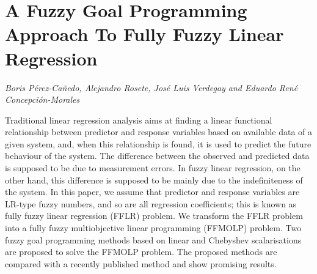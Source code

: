 \documentclass[../booklet.tex]{subfiles}
\begin{document}
\section[A Fuzzy Goal Programming Approach To Fully Fuzzy Linear Regression. {\it Boris Pérez-Cañedo, Alejandro Rosete, José Luis Verdegay and Eduardo René Concepción-Morales}]{A Fuzzy Goal Programming Approach To Fully Fuzzy Linear Regression}
   

\begin{center}
  {\it Boris Pérez-Cañedo, Alejandro Rosete, José Luis Verdegay and Eduardo René Concepción-Morales}
\end{center}

\vskip 0.8cm


Traditional linear regression analysis aims at finding a linear functional relationship between predictor and response variables based on available data of a given system, and, when this relationship is found, it is used to predict the future behaviour of the system. The difference between the observed and predicted data is supposed to be due to measurement errors. In fuzzy linear regression, on the other hand, this difference is supposed to be mainly due to the indefiniteness of the system. In this paper, we assume that predictor and response variables are LR-type fuzzy numbers, and so are all regression coefficients; this is known as fully fuzzy linear regression (FFLR) problem. We transform the FFLR problem into a fully fuzzy multiobjective linear programming (FFMOLP) problem. Two fuzzy goal programming methods based on linear and Chebyshev scalarisations are proposed to solve the FFMOLP problem. The proposed methods are compared with a recently published method and show promising results.

\end{document}
